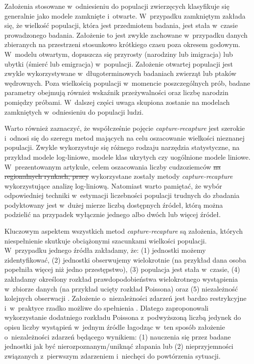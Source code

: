 \documentclass[12pt,a4paper]{article}
\providecommand{\DIFdel}[1]{{\protect\color{red}\sout{#1}}}                      %
\providecommand{\DIFdelbegin}{} %
\providecommand{\DIFdelend}{} %
\begin{document}
Założenia stosowane w~odniesieniu do populacji zwierzęcych klasyfikuje się generalnie jako modele zamknięte i~otwarte. W~przypadku zamkniętym zakłada się, że wielkość populacji, która jest przedmiotem badania, jest stała w~czasie prowadzonego badania. Założenie to jest zwykle zachowane w~przypadku danych zbieranych na przestrzeni stosunkowo krótkiego czasu poza okresem godowym. W~modelu otwartym, dopuszcza się przyrosty (narodziny lub imigracja) lub ubytki (śmierć lub emigracja) w~populacji. Założenie otwartej populacji jest zwykle wykorzystywane w~długoterminowych badaniach zwierząt lub ptaków wędrownych. Poza wielkością populacji w~momencie poszczególnych prób, badane parametry obejmują również wskaźnik przeżywalności oraz liczbę narodzin pomiędzy próbami. W~dalszej części uwaga skupiona zostanie na modelach zamkniętych w~odniesieniu do populacji ludzi. 

Warto również zaznaczyć, że współcześnie pojęcie \textit{capture-recapture} jest szerokie i~odnosi się do szeregu metod mających na celu oszacowanie wielkości nieznanej populacji. Zwykle wykorzystuje się różnego rodzaju narzędzia statystyczne, na przykład modele log-liniowe, modele klas ukrytych czy uogólnione modele liniowe. W~prezentowanym artykule, celem oszacowania liczby cudzoziemców \DIFdelbegin \DIFdel{na regionalnych rynkach, pracy }\DIFdelend wykorzystane zostały metody \textit{capture-recapture} wykorzystujące analizę log-liniową. Natomiast warto pamiętać, że wybór odpowiedniej techniki w~estymacji liczebności populacji trudnych do zbadania podyktowany jest w~dużej mierze liczbą dostępnych źródeł, którą można podzielić na przypadek wyłącznie jednego albo dwóch lub więcej źródeł. 

Kluczowym aspektem wszystkich metod \textit{capture-recapture} są założenia, których niespełnienie skutkuje obciążonymi szacunkami wielkości populacji. W~przypadku jednego źródła zakładamy, że: (1) jednostki możemy zidentyfikować, (2) jednostki obserwujemy wielokrotnie (na przykład dana osoba popełniła więcej niż jedno przestępstwo), (3) populacja jest stała w~czasie, (4) zakładamy określony rozkład prawdopodobieństwa wielokrotnego wystąpienia w~zbiorze danych (na przykład ucięty rozkład Poissona) oraz (5) niezależność kolejnych obserwacji \citep[por. ][]{van2003point,van2003estimating}. Założenie o~niezależności zdarzeń jest bardzo restrykcyjne i~w~praktyce rzadko możliwe do spełnienia \citep[por. ][]{zhang2008developing}. Dlatego \citet{godwin2017estimation} zaproponowali wykorzystanie dodatniego rozkładu Poissona z~podwyższoną liczbą jedynek do opisu liczby wystąpień w~jednym źródle łagodząc w~ten sposób założenie o~niezależności zdarzeń będącego wynikiem: (1) nauczenia się przez badane jednostki jak być nierozpoznanym/uniknąć złapania lub (2) nieprzyjemności związanych z~pierwszym zdarzeniem i~niechęci do powtórzenia sytuacji. 
\end{document}
